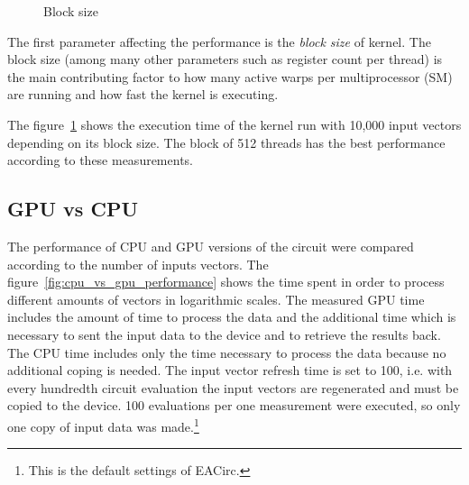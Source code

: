 \documentclass[12pt,twoside]{fithesis2}
\begin{document}
\begin{figure}[h]
	\centering
	\caption{Block size}
	\label{fig:block_size}
\end{figure}

The first parameter affecting the performance is the \emph{block size} of kernel. The block size (among many other parameters such as register count per thread) is the main contributing factor to how many active warps per multiprocessor (SM) are running and how fast the kernel is executing.~\cite{cuda_best_practices}

The figure~\ref{fig:block_size} shows the execution time of the kernel run with 10,000 input vectors depending on its block size. The block of 512 threads has the best performance according to these measurements.

\subsection{GPU vs CPU}

The performance of CPU and GPU versions of the circuit were compared according to the number of inputs vectors. The figure~\ref{fig:cpu_vs_gpu_performance} shows the time spent in order to process different amounts of vectors in logarithmic scales. The measured GPU time includes the amount of time to process the data and the additional time which is necessary to sent the input data to the device and to retrieve the results back. The CPU time includes only the time necessary to process the data because no additional coping is needed. The input vector refresh time is set to 100, i.e. with every hundredth circuit evaluation the input vectors are regenerated and must be copied to the device. 100 evaluations per one measurement were executed, so only one copy of input data was made.\footnote{This is the default settings of EACirc.}
\end{document}

